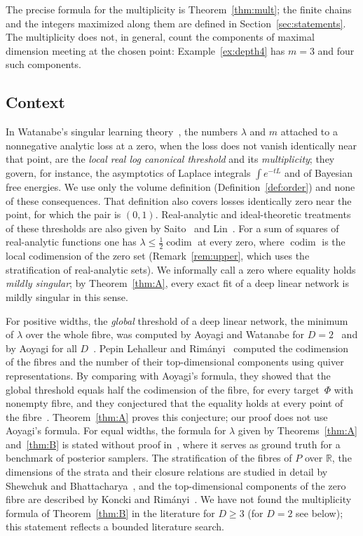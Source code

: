 \documentclass[11pt,a4paper]{article}
\theoremstyle{definition}
\theoremstyle{remark}
\numberwithin{equation}{section}
\newcommand{\R}{\mathbb{R}}
\newcommand{\codim}{\operatorname{codim}}
\begin{document}
The precise formula for the multiplicity is Theorem~\ref{thm:mult}; the finite chains and the integers maximized along them are defined in Section~\ref{sec:statements}. The multiplicity does not, in general, count the components of maximal dimension meeting at the chosen point: Example~\ref{ex:depth4} has $m=3$ and four such components.

\subsection{Context}
In Watanabe's singular learning theory~\cite{watanabe-book,watanabe-2018}, the numbers $\lambda$ and $m$ attached to a nonnegative analytic loss at a zero, when the loss does not vanish identically near that point, are the \emph{local real log canonical threshold} and its \emph{multiplicity}; they govern, for instance, the asymptotics of Laplace integrals $\int e^{-tL}$ and of Bayesian free energies. We use only the volume definition (Definition~\ref{def:order}) and none of these consequences. That definition also covers losses identically zero near the point, for which the pair is $(0,1)$. Real-analytic and ideal-theoretic treatments of these thresholds are also given by Saito~\cite{saito} and Lin~\cite{lin}. For a sum of squares of real-analytic functions one has $\lambda\le\frac{1}{2}\codim$ at every zero, where $\codim$ is the local codimension of the zero set (Remark~\ref{rem:upper}, which uses the stratification of real-analytic sets). We informally call a zero where equality holds \emph{mildly singular}; by Theorem~\ref{thm:A}, every exact fit of a deep linear network is mildly singular in this sense.

For positive widths, the \emph{global} threshold of a deep linear network, the minimum of $\lambda$ over the whole fibre, was computed by Aoyagi and Watanabe for $D=2$~\cite{aoyagi-watanabe} and by Aoyagi for all $D$~\cite{aoyagi-2024}. Pepin Lehalleur and Rimányi~\cite{lehalleur-rimanyi} computed the codimension of the fibres and the number of their top-dimensional components using quiver representations. By comparing with Aoyagi's formula, they showed that the global threshold equals half the codimension of the fibre, for every target~$\Phi$ with nonempty fibre, and they conjectured that the equality holds at every point of the fibre~\cite[Section~8]{lehalleur-rimanyi}. Theorem~\ref{thm:A} proves this conjecture; our proof does not use Aoyagi's formula. For equal widths, the formula for $\lambda$ given by Theorems~\ref{thm:A} and~\ref{thm:B} is stated without proof in~\cite[Appendix~B, Theorem~B.5]{hitchcock-hoogland}, where it serves as ground truth for a benchmark of posterior samplers. The stratification of the fibres of $P$ over $\R$, the dimensions of the strata and their closure relations are studied in detail by Shewchuk and Bhattacharya~\cite{shewchuk-bhattacharya}, and the top-dimensional components of the zero fibre are described by Koncki and Rimányi~\cite{koncki-rimanyi}. We have not found the multiplicity formula of Theorem~\ref{thm:B} in the literature for $D\ge3$ (for $D=2$ see below); this statement reflects a bounded literature search.
\end{document}
